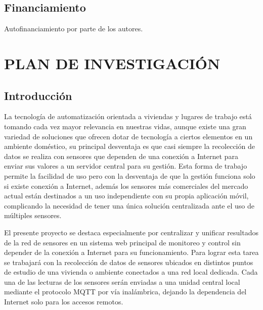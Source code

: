\documentclass[a4paper, 12pt]{article}
\begin{document}

\subsection{Financiamiento}

Autofinanciamiento por parte de los autores.




\section{PLAN DE INVESTIGACIÓN}

\subsection{Introducción}
La tecnología de automatización orientada a viviendas y lugares de trabajo está tomando cada vez mayor relevancia en nuestras vidas, aunque existe una gran variedad de soluciones que ofrecen dotar de tecnología a ciertos elementos en un ambiente doméstico, su principal desventaja es que casi siempre la recolección de datos se realiza con sensores que dependen de una conexión a Internet para enviar sus valores a un servidor central para su gestión. Esta forma de trabajo permite la facilidad de uso pero con la desventaja de que la gestión funciona solo si existe conexión a Internet, además los sensores más comerciales del mercado actual están destinados a un uso independiente con su propia aplicación móvil, complicando la necesidad de tener una única solución centralizada ante el uso de múltiples sensores.

\vspace{0.25cm}
El presente proyecto se destaca especialmente por centralizar y unificar resultados de la red de sensores en un sistema web principal de monitoreo y control sin depender de la conexión a Internet para su funcionamiento. Para lograr esta tarea se trabajará con la recolección de datos de sensores ubicados en distintos puntos de estudio de una vivienda o ambiente conectados a una red local dedicada. Cada una de las lecturas de los sensores serán enviadas a una unidad central local mediante el protocolo MQTT por vía inalámbrica, dejando la dependencia del Internet solo para los accesos remotos.
\end{document}
